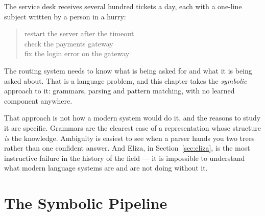 The service desk receives several hundred tickets a day, each with a one-line
subject written by a person in a hurry:

\begin{quote}\ttfamily\small
restart the server after the timeout\\
check the payments gateway\\
fix the login error on the gateway
\end{quote}

The routing system needs to know what is being asked for and what it is being asked
about. That is a language problem, and this chapter takes the \emph{symbolic}
approach to it: grammars, parsing and pattern matching, with no learned component
anywhere.

That approach is not how a modern system would do it, and the reasons to study it
are specific. Grammars are the clearest case of a representation whose structure
\emph{is} the knowledge. Ambiguity is easiest to see when a parser hands you two
trees rather than one confident answer. And Eliza, in Section~\ref{sec:eliza}, is
the most instructive failure in the history of the field --- it is impossible to
understand what modern language systems are and are not doing without it.

\section{The Symbolic Pipeline}

